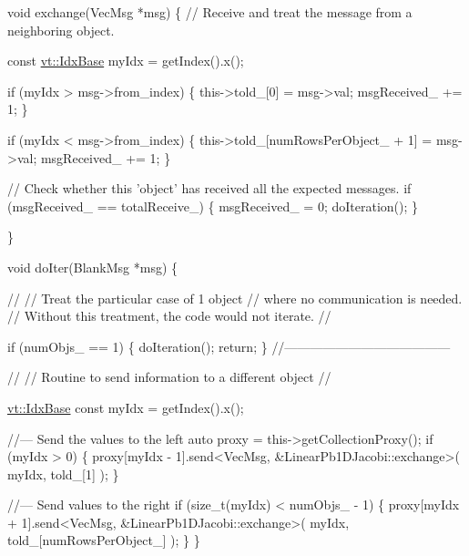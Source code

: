 \begin{DoxyCodeInclude}
  \textcolor{keywordtype}{void} exchange(VecMsg *msg) \{
    \textcolor{comment}{// Receive and treat the message from a neighboring object.}

    \textcolor{keyword}{const} \hyperlink{namespacevt_afb96657e28fa98eb685c5e0c6b1b122e}{vt::IdxBase} myIdx = getIndex().x();

    \textcolor{keywordflow}{if} (myIdx > msg->from\_index) \{
      this->told\_[0] = msg->val;
      msgReceived\_ += 1;
    \}

    \textcolor{keywordflow}{if} (myIdx < msg->from\_index) \{
      this->told\_[numRowsPerObject\_ + 1] = msg->val;
      msgReceived\_ += 1;
    \}

    \textcolor{comment}{// Check whether this 'object' has received all the expected messages.}
    \textcolor{keywordflow}{if} (msgReceived\_ == totalReceive\_) \{
      msgReceived\_ = 0;
      doIteration();
    \}

  \}

  \textcolor{keywordtype}{void} doIter(BlankMsg *msg) \{

    \textcolor{comment}{//}
    \textcolor{comment}{// Treat the particular case of 1 object}
    \textcolor{comment}{// where no communication is needed.}
    \textcolor{comment}{// Without this treatment, the code would not iterate.}
    \textcolor{comment}{//}

    \textcolor{keywordflow}{if} (numObjs\_ == 1) \{
      doIteration();
      \textcolor{keywordflow}{return};
    \}
    \textcolor{comment}{//---------------------------------------}

    \textcolor{comment}{//}
    \textcolor{comment}{// Routine to send information to a different object}
    \textcolor{comment}{//}

    \hyperlink{namespacevt_afb96657e28fa98eb685c5e0c6b1b122e}{vt::IdxBase} \textcolor{keyword}{const} myIdx = getIndex().x();

    \textcolor{comment}{//--- Send the values to the left}
    \textcolor{keyword}{auto} proxy = this->getCollectionProxy();
    \textcolor{keywordflow}{if} (myIdx > 0) \{
      proxy[myIdx - 1].send<VecMsg, &LinearPb1DJacobi::exchange>(
        myIdx, told\_[1]
      );
    \}

    \textcolor{comment}{//--- Send values to the right}
    \textcolor{keywordflow}{if} (\textcolor{keywordtype}{size\_t}(myIdx) < numObjs\_ - 1) \{
      proxy[myIdx + 1].send<VecMsg, &LinearPb1DJacobi::exchange>(
        myIdx, told\_[numRowsPerObject\_]
      );
    \}
  \}



\end{DoxyCodeInclude}
